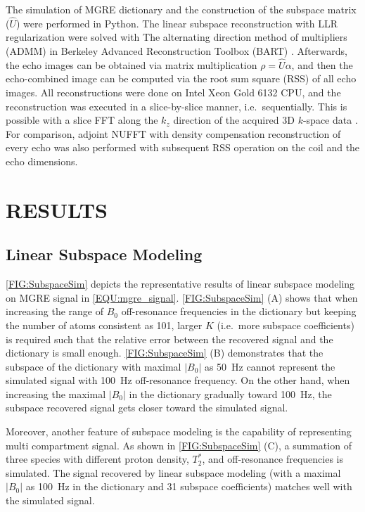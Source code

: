 \documentclass[a4paper,11pt]{article}
\begin{document}
The simulation of MGRE dictionary and
the construction of the subspace matrix ($\hat{U}$)
were performed in Python.
The linear subspace reconstruction with LLR regularization
were solved with The alternating direction method of multipliers (ADMM)
\cite{boyd_2010_admm} in Berkeley Advanced Reconstruction Toolbox (BART)
\cite{uecker_2015_bart}.
Afterwards, the echo images can be obtained via matrix multiplication
$\rho = \hat{U} \alpha$, and then the echo-combined image
can be computed via the root sum square (RSS) of all echo images.
All reconstructions were done on Intel Xeon Gold 6132 CPU,
and the reconstruction was executed in a slice-by-slice manner,
i.e.~sequentially. This is possible with a slice FFT along the $k_z$ direction
of the acquired 3D $k$-space data \cite{feng_2014_grasp}.
For comparison, adjoint NUFFT with density compensation reconstruction
of every echo was also performed with subsequent RSS operation
on the coil and the echo dimensions.


\section{RESULTS}

\subsection*{Linear Subspace Modeling}

\cref{FIG:SubspaceSim} depicts the representative results of
linear subspace modeling on MGRE signal in \cref{EQU:mgre_signal}.
\cref{FIG:SubspaceSim} (A) shows that when increasing the range
of $B_0$ off-resonance frequencies in the dictionary
but keeping the number of atoms consistent as 101,
larger $K$ (i.e.~more subspace coefficients) is required
such that the relative error between the recovered signal and
the dictionary is small enough.
\cref{FIG:SubspaceSim} (B) demonstrates that
the subspace of the dictionary with maximal $|B_0|$ as \SI{50}{\Hz}
cannot represent the simulated signal with \SI{100}{\Hz} off-resonance frequency.
On the other hand, when increasing the maximal $|B_0|$ in the dictionary
gradually toward \SI{100}{\Hz},
the subspace recovered signal gets closer toward the simulated signal.

Moreover, another feature of subspace modeling is the capability of
representing multi compartment signal.
As shown in \cref{FIG:SubspaceSim} (C),
a summation of three species with different proton density, $T_2^*$,
and off-resonance frequencies is simulated.
The signal recovered by linear subspace modeling
(with a maximal $|B_0|$ as 100~\si{\Hz} in the dictionary and 31 subspace coefficients)
matches well with the simulated signal.
\end{document}
